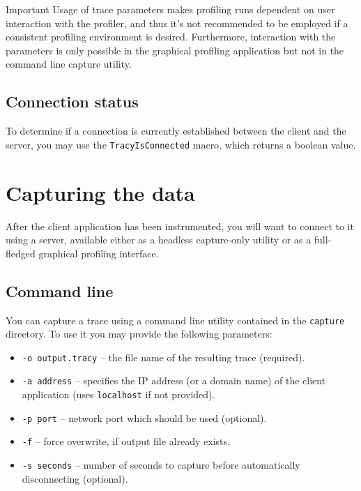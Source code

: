 \documentclass[hidelinks,titlepage,a4paper]{article}
\begin{document}
\begin{bclogo}[
noborder=true,
couleur=black!5,
logo=\bcbombe
]{Important}
Usage of trace parameters makes profiling runs dependent on user interaction with the profiler, and thus it's not recommended to be employed if a consistent profiling environment is desired. Furthermore, interaction with the parameters is only possible in the graphical profiling application but not in the command line capture utility.
\end{bclogo}

\subsection{Connection status}
\label{connectionstatus}

To determine if a connection is currently established between the client and the server, you may use the \texttt{TracyIsConnected} macro, which returns a boolean value.

\section{Capturing the data}
\label{capturing}

After the client application has been instrumented, you will want to connect to it using a server, available either as a headless capture-only utility or as a full-fledged graphical profiling interface.

\subsection{Command line}

You can capture a trace using a command line utility contained in the \texttt{capture} directory. To use it you may provide the following parameters:

\begin{itemize}
\item \texttt{-o output.tracy} -- the file name of the resulting trace (required).
\item \texttt{-a address} -- specifies the IP address (or a domain name) of the client application (uses \texttt{localhost} if not provided).
\item \texttt{-p port} -- network port which should be used (optional).
\item \texttt{-f} -- force overwrite, if output file already exists.
\item \texttt{-s seconds} -- number of seconds to capture before automatically disconnecting (optional).
\end{itemize}
\end{document}
